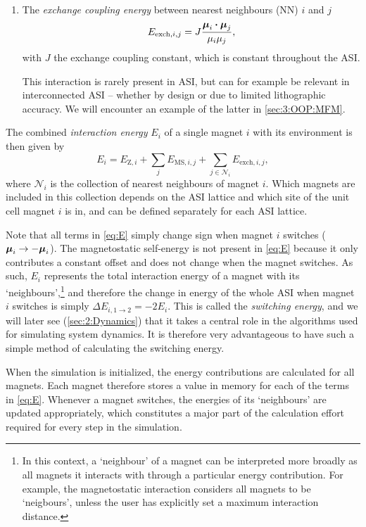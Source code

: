 \begin{enumerate}
	\item The \textit{exchange coupling energy} between nearest neighbours (NN) $i$ and $j$
	\begin{equation}
		E_{\mathrm{exch},i,j} = J \frac{\boldsymbol{\mathbf{\mu}}_i \boldsymbol{\cdot} \boldsymbol{\mathbf{\mu}}_j}{\mu_i \mu_j} \mathrm{,} \label{eq:E_exch}
	\end{equation}
	with $J$ the exchange coupling constant, which is constant throughout the ASI. \par
	This interaction is rarely present in ASI, but can for example be relevant in interconnected ASI -- whether by design or due to limited lithographic accuracy.
	We will encounter an example of the latter in \cref{sec:3:OOP:MFM}.
\end{enumerate}

The combined \textit{interaction energy} $E_i$ of a single magnet $i$ with its environment is then given by
\begin{equation}
	E_i = E_{\mathrm{Z},i} + \sum_j E_{\mathrm{MS},i,j} + \sum_{j \in \mathcal{N}_i} E_{\mathrm{exch},i,j} \mathrm{,}
	\label{eq:E}
\end{equation}
where $\mathcal{N}_i$ is the collection of nearest neighbours of magnet $i$.
Which magnets are included in this collection depends on the ASI lattice and which site of the unit cell magnet $i$ is in, and can be defined separately for each ASI lattice. \\\par
Note that all terms in \cref{eq:E} simply change sign when magnet $i$ switches ($\boldsymbol{\mathbf{\mu}}_i \rightarrow -\boldsymbol{\mathbf{\mu}}_i$).
The magnetostatic self-energy is not present in \cref{eq:E} because it only contributes a constant offset and does not change when the magnet switches.
As such, $E_i$ represents the total interaction energy of a magnet with its `neighbours',\footnote{
	In this context, a `neighbour' of a magnet can be interpreted more broadly as all magnets it interacts with through a particular energy contribution. For example, the magnetostatic interaction considers all magnets to be `neigbours', unless the user has explicitly set a maximum interaction distance.
} and therefore the change in energy of the whole ASI when magnet $i$ switches is simply $\Delta E_{i,1\rightarrow2} = -2 E_i$.
This is called the \textit{switching energy}, and we will later see (\cref{sec:2:Dynamics}) that it takes a central role in the algorithms used for simulating system dynamics.
It is therefore very advantageous to have such a simple method of calculating the switching energy. \par
When the simulation is initialized, the energy contributions are calculated for all magnets.
Each magnet therefore stores a value in memory for each of the terms in \cref{eq:E}.
Whenever a magnet switches, the energies of its `neighbours' are updated appropriately, which constitutes a major part of the calculation effort required for every step in the simulation.

